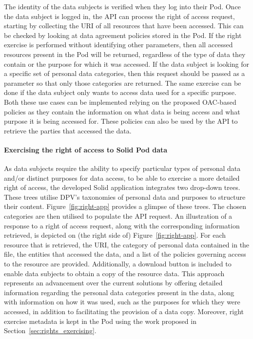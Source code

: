 The identity of the data subjects is verified when they log into their Pod.
Once the data subject is logged in, the API can process the right of access request, starting by collecting the URI of all resources that have been accessed.
This can be checked by looking at data agreement policies stored in the Pod. 
If the right exercise is performed without identifying other parameters, then all accessed resources present in the Pod will be returned, regardless of the type of data they contain or the purpose for which it was accessed. 
If the data subject is looking for a specific set of personal data categories, then this request should be passed as a parameter so that only those categories are returned. 
The same exercise can be done if the data subject only wants to access data used for a specific purpose.
Both these use cases can be implemented relying on the proposed OAC-based policies as they contain the information on what data is being access and what purpose it is being accessed for.
These policies can also be used by the API to retrieve the parties that accessed the data.

\paragraph{Exercising the right of access to Solid Pod data}
As data subjects require the ability to specify particular types of personal data and/or distinct purposes for data access, to be able to exercise a more detailed right of access, the developed Solid application integrates two drop-down trees.
These trees utilise DPV's taxonomies of personal data and purposes to structure their content.
Figure~\ref{fig:right-app} provides a glimpse of these trees.
The chosen categories are then utilised to populate the API request.
An illustration of a response to a right of access request, along with the corresponding information retrieved, is depicted on (the right side of) Figure~\ref{fig:right-app}.
For each resource that is retrieved, the URI, the category of personal data contained in the file, the entities that accessed the data, and a list of the policies governing access to the resource are provided.
Additionally, a download button is included to enable data subjects to obtain a copy of the resource data.
This approach represents an advancement over the current solutions by offering detailed information regarding the personal data categories present in the data, along with information on how it was used, such as the purposes for which they were accessed, in addition to facilitating the provision of a data copy.
Moreover, right exercise metadata is kept in the Pod using the work proposed in Section~\ref{sec:rights_exercising}.


